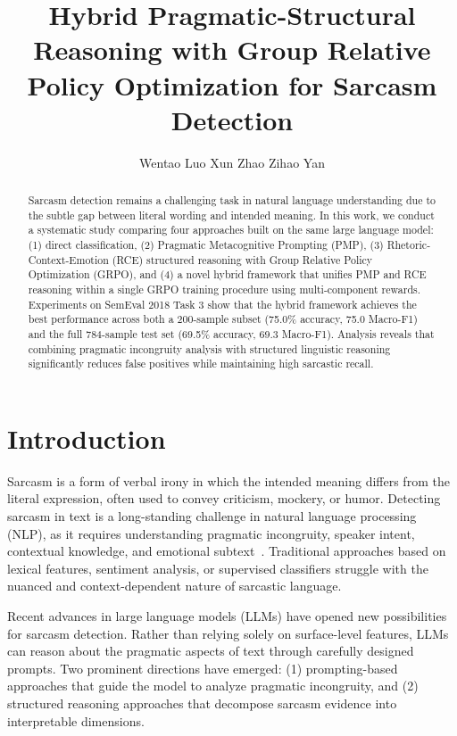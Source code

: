\documentclass{article}
\title{Hybrid Pragmatic-Structural Reasoning with Group Relative\\Policy Optimization for Sarcasm Detection}
\author{
Wentao Luo \And Xun Zhao \AND Zihao Yan
}
\begin{document}
\ifcolmsubmission
\linenumbers
\fi

\maketitle

\begin{abstract}
Sarcasm detection remains a challenging task in natural language understanding due to the subtle gap between literal wording and intended meaning. In this work, we conduct a systematic study comparing four approaches built on the same large language model: (1) direct classification, (2) Pragmatic Metacognitive Prompting (PMP), (3) Rhetoric-Context-Emotion (RCE) structured reasoning with Group Relative Policy Optimization (GRPO), and (4) a novel hybrid framework that unifies PMP and RCE reasoning within a single GRPO training procedure using multi-component rewards. Experiments on SemEval 2018 Task 3 show that the hybrid framework achieves the best performance across both a 200-sample subset (75.0\% accuracy, 75.0 Macro-F1) and the full 784-sample test set (69.5\% accuracy, 69.3 Macro-F1). Analysis reveals that combining pragmatic incongruity analysis with structured linguistic reasoning significantly reduces false positives while maintaining high sarcastic recall.
\end{abstract}

\section{Introduction}

Sarcasm is a form of verbal irony in which the intended meaning differs from the literal expression, often used to convey criticism, mockery, or humor. Detecting sarcasm in text is a long-standing challenge in natural language processing (NLP), as it requires understanding pragmatic incongruity, speaker intent, contextual knowledge, and emotional subtext~\citep{joshi2017context}. Traditional approaches based on lexical features, sentiment analysis, or supervised classifiers struggle with the nuanced and context-dependent nature of sarcastic language.

Recent advances in large language models (LLMs) have opened new possibilities for sarcasm detection. Rather than relying solely on surface-level features, LLMs can reason about the pragmatic aspects of text through carefully designed prompts. Two prominent directions have emerged: (1) prompting-based approaches that guide the model to analyze pragmatic incongruity, and (2) structured reasoning approaches that decompose sarcasm evidence into interpretable dimensions.
\end{document}
